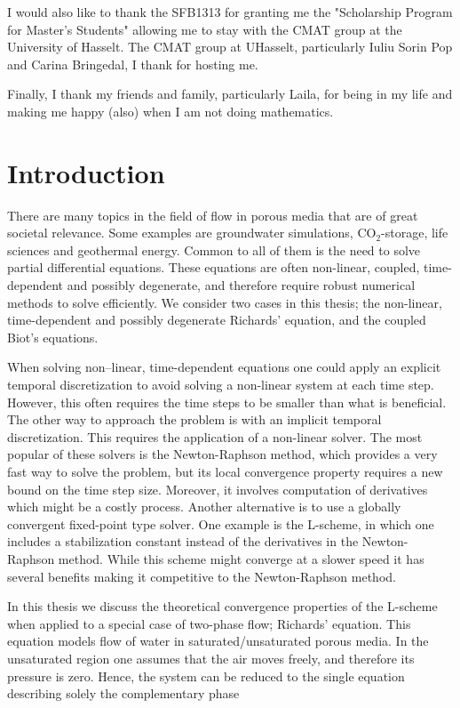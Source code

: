\documentclass[../Main/main.tex]{subfiles}
\begin{document}
I would also like to thank the SFB1313 for granting me the "Scholarship Program for Master's Students" allowing me to stay with the CMAT group at the University of Hasselt. The CMAT group at UHasselt, particularly Iuliu Sorin Pop and Carina Bringedal, I thank for hosting me.

Finally, I thank my friends and family, particularly Laila, for being in my life and making me happy (also) when I am not doing mathematics. 
\chapter{Introduction}
There are many topics in the field of flow in porous media that are  of great societal relevance. Some examples are groundwater simulations, $\text{CO}_2$-storage, life sciences and geothermal energy. Common to all of them is the need to solve partial differential equations. These equations are often non-linear, coupled, time-dependent and possibly degenerate, and therefore require robust numerical methods to solve efficiently. We consider two cases in this thesis; the non-linear, time-dependent and possibly degenerate Richards' equation, and the coupled Biot's equations.

When solving non–linear, time-dependent equations one could apply an explicit temporal discretization to avoid solving a non-linear system at each time step. However, this often requires the time steps to be smaller than what is beneficial. The other way to approach the problem is with an implicit temporal discretization. This requires the application of a non-linear solver. The most popular of these solvers is the Newton-Raphson method, which provides a very fast way to solve the problem, but its local convergence property requires a new bound on the time step size. Moreover, it involves computation of derivatives which might be a costly process. Another alternative is to use a globally convergent fixed-point type solver. One example is the L-scheme, in which one includes a stabilization constant instead of the derivatives in the Newton-Raphson method. While this scheme might converge at a slower speed it has several benefits making it competitive to the Newton-Raphson method. 

In this thesis we discuss the theoretical convergence properties of the L-scheme when applied to a special case of two-phase flow; Richards' equation. This equation models flow of water in saturated/unsaturated porous media. In the unsaturated region one assumes that the air moves freely, and therefore its pressure is zero. Hence, the system can be reduced to the single equation describing solely the complementary phase
 
\end{document}

